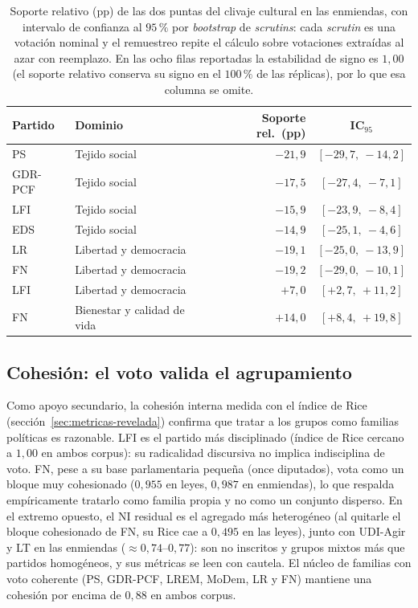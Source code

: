 \begin{table}[H]
\centering
\caption{Soporte relativo (pp) de las dos puntas del clivaje cultural en las
enmiendas, con intervalo de confianza al $95\,\%$ por \emph{bootstrap} de
\emph{scrutins}: cada \emph{scrutin} es una votación nominal y el remuestreo repite
el cálculo sobre votaciones extraídas al azar con reemplazo. En las ocho filas
reportadas la estabilidad de signo es $1{,}00$ (el soporte relativo conserva su
signo en el $100\,\%$ de las réplicas), por lo que esa columna se omite.}
\label{tab:clivaje-ci}
\begin{tabular}{@{}l l r c@{}}
\toprule
\textbf{Partido} & \textbf{Dominio} & \textbf{Soporte rel.\ (pp)} & \textbf{IC$_{95}$} \\
\midrule
PS & Tejido social & $-21{,}9$ & $[-29{,}7,\ -14{,}2]$ \\
GDR-PCF & Tejido social & $-17{,}5$ & $[-27{,}4,\ -7{,}1]$ \\
LFI & Tejido social & $-15{,}9$ & $[-23{,}9,\ -8{,}4]$ \\
EDS & Tejido social & $-14{,}9$ & $[-25{,}1,\ -4{,}6]$ \\
LR & Libertad y democracia & $-19{,}1$ & $[-25{,}0,\ -13{,}9]$ \\
FN & Libertad y democracia & $-19{,}2$ & $[-29{,}0,\ -10{,}1]$ \\
LFI & Libertad y democracia & $+7{,}0$ & $[+2{,}7,\ +11{,}2]$ \\
FN & Bienestar y calidad de vida & $+14{,}0$ & $[+8{,}4,\ +19{,}8]$ \\
\bottomrule
\end{tabular}
\end{table}

\subsection{Cohesión: el voto valida el agrupamiento}
\label{sec:res-revelada-cohesion}

Como apoyo secundario, la cohesión interna medida con el índice de Rice
(sección~\ref{sec:metricas-revelada}) confirma que tratar a los grupos como
familias políticas es razonable. LFI es el partido más disciplinado (índice de
Rice cercano a $1{,}00$ en ambos corpus): su radicalidad discursiva no implica
indisciplina de voto. FN, pese a su base parlamentaria pequeña (once diputados),
vota como un bloque muy cohesionado ($0{,}955$ en leyes, $0{,}987$ en enmiendas),
lo que respalda empíricamente tratarlo como familia propia y no como un conjunto
disperso. En el extremo opuesto, el NI residual es el agregado más heterogéneo
(al quitarle el bloque cohesionado de FN, su Rice cae a $0{,}495$ en las
leyes), junto con UDI-Agir y LT en las enmiendas ($\approx 0{,}74$--$0{,}77$):
son no inscritos y grupos mixtos más que partidos homogéneos, y sus métricas se
leen con cautela. El núcleo de familias con voto coherente (PS, GDR-PCF, LREM,
MoDem, LR y FN) mantiene una cohesión por encima de $0{,}88$ en ambos corpus.

